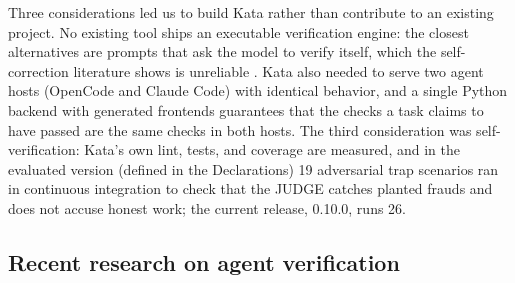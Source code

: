 \documentclass{sbc2019}%
\begin{document}
Three considerations led us to build Kata rather than contribute to an
existing project. No existing tool ships an executable verification engine:
the closest alternatives are prompts that ask the model to verify itself,
which the self-correction literature shows is unreliable \cite{selfcorrect}.
Kata also needed to serve two agent hosts (OpenCode and Claude Code) with
identical behavior, and a single Python backend with generated frontends
guarantees that the checks a task claims to have passed are the same checks
in both hosts. The third consideration was self-verification: Kata's own
lint, tests, and coverage are measured, and in the evaluated version
(defined in the Declarations) 19 adversarial trap scenarios ran in continuous integration to
check that the JUDGE catches planted frauds and does not accuse honest
work; the current release, 0.10.0, runs 26.

\subsection{Recent research on agent verification}
\end{document}
